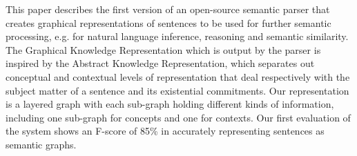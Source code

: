 This paper describes the first version of an open-source semantic parser that creates graphical representations of sentences to be used for further semantic processing, e.g. for natural language inference, reasoning and semantic similarity. The Graphical Knowledge Representation which is output by the parser is inspired by the Abstract Knowledge Representation, which separates out conceptual and contextual levels of representation that deal respectively with the subject matter of a sentence and its existential commitments. Our representation is a layered graph with each sub-graph holding different kinds of information, including one sub-graph for concepts and one for contexts. Our first evaluation of the system shows an F-score of 85\%  in accurately representing sentences as semantic graphs.
